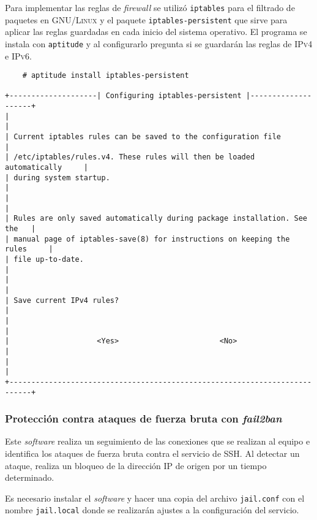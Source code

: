 Para implementar las reglas de \textit{firewall} se utiliz\'{o} \texttt{iptables} para el filtrado de paquetes en \textsc{GNU/Linux} y el paquete \texttt{iptables-persistent} que sirve para aplicar las reglas guardadas en cada inicio del sistema operativo. El programa se instala con \texttt{aptitude} y al configurarlo pregunta si se guardar\'{a}n las reglas de \textsc{IPv4} e \textsc{IPv6}.

{
\scriptsize
\linespread{1}
\begin{verbatim}
    # aptitude install iptables-persistent

+--------------------| Configuring iptables-persistent |--------------------+
|                                                                           |
| Current iptables rules can be saved to the configuration file             |
| /etc/iptables/rules.v4. These rules will then be loaded automatically     |
| during system startup.                                                    |
|                                                                           |
| Rules are only saved automatically during package installation. See the   |
| manual page of iptables-save(8) for instructions on keeping the rules     |
| file up-to-date.                                                          |
|                                                                           |
| Save current IPv4 rules?                                                  |
|                                                                           |
|                    <Yes>                       <No>                       |
|                                                                           |
+---------------------------------------------------------------------------+
\end{verbatim}
}

        \subsubsection {Protecci\'{o}n contra ataques de fuerza bruta con \textit{fail2ban}}

Este \textit{software} realiza un seguimiento de las conexiones que se realizan al equipo e identifica los ataques de fuerza bruta contra el servicio de \textsc{SSH}. Al detectar un ataque, realiza un bloqueo de la direcci\'{o}n \textsc{IP} de origen por un tiempo determinado.

Es necesario instalar el \textit{software} y hacer una copia del archivo \texttt{jail.conf} con el nombre \texttt{jail.local} donde se realizar\'{a}n ajustes a la configuraci\'{o}n del servicio.

